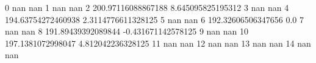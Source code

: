 0 nan nan
1 nan nan
2 200.97116088867188 8.645095825195312
3 nan nan
4 194.63754272460938 2.3114776611328125
5 nan nan
6 192.32606506347656 0.0
7 nan nan
8 191.89439392089844 -0.431671142578125
9 nan nan
10 197.1381072998047 4.812042236328125
11 nan nan
12 nan nan
13 nan nan
14 nan nan
